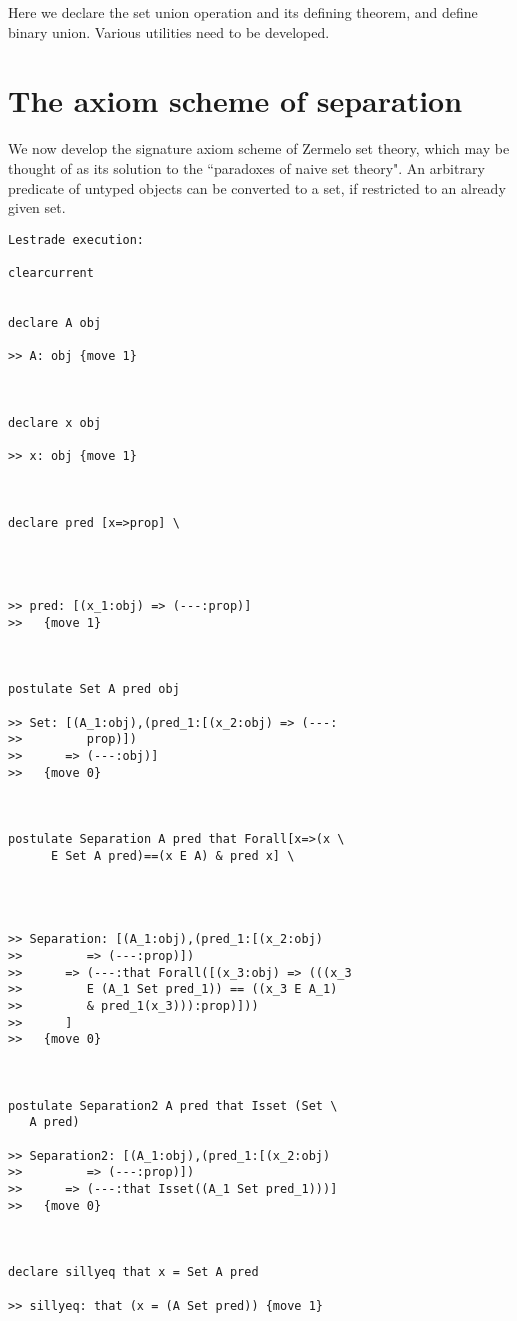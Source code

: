 \documentclass[12pt]{article}
\begin{document}
Here we declare the set union operation and its defining theorem, and define binary union.  Various utilities need to be developed.

\section{The axiom scheme of separation}

We now develop the signature axiom scheme of Zermelo set theory, which may be thought of as its solution to the ``paradoxes of naive set theory".  An arbitrary predicate of untyped objects can be converted to a set, if restricted to an already given set.

\begin{verbatim}Lestrade execution:

clearcurrent


declare A obj

>> A: obj {move 1}



declare x obj

>> x: obj {move 1}



declare pred [x=>prop] \
   



>> pred: [(x_1:obj) => (---:prop)]
>>   {move 1}



postulate Set A pred obj

>> Set: [(A_1:obj),(pred_1:[(x_2:obj) => (---:
>>         prop)])
>>      => (---:obj)]
>>   {move 0}



postulate Separation A pred that Forall[x=>(x \
      E Set A pred)==(x E A) & pred x] \
   



>> Separation: [(A_1:obj),(pred_1:[(x_2:obj)
>>         => (---:prop)])
>>      => (---:that Forall([(x_3:obj) => (((x_3
>>         E (A_1 Set pred_1)) == ((x_3 E A_1)
>>         & pred_1(x_3))):prop)]))
>>      ]
>>   {move 0}



postulate Separation2 A pred that Isset (Set \
   A pred)

>> Separation2: [(A_1:obj),(pred_1:[(x_2:obj)
>>         => (---:prop)])
>>      => (---:that Isset((A_1 Set pred_1)))]
>>   {move 0}



declare sillyeq that x = Set A pred

>> sillyeq: that (x = (A Set pred)) {move 1}




\end{verbatim}
\end{document}

